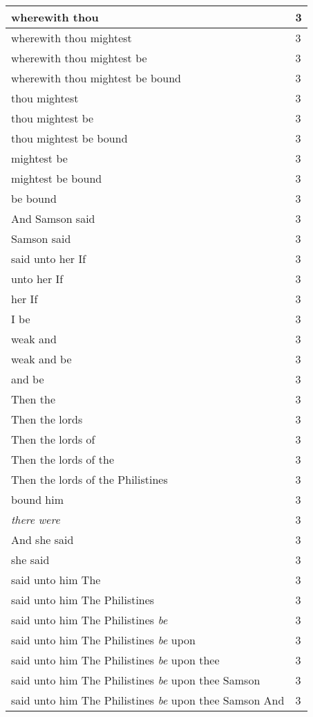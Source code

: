 \begin{center}
\begin{longtable}{|p{3.0in}|p{0.5in}|}
wherewith thou & 3\\ \hline 
wherewith thou mightest & 3\\ \hline 
wherewith thou mightest be & 3\\ \hline 
wherewith thou mightest be bound & 3\\ \hline 
thou mightest & 3\\ \hline 
thou mightest be & 3\\ \hline 
thou mightest be bound & 3\\ \hline 
mightest be & 3\\ \hline 
mightest be bound & 3\\ \hline 
be bound & 3\\ \hline 
And Samson said & 3\\ \hline 
Samson said & 3\\ \hline 
said unto her If & 3\\ \hline 
unto her If & 3\\ \hline 
her If & 3\\ \hline 
I be & 3\\ \hline 
weak and & 3\\ \hline 
weak and be & 3\\ \hline 
and be & 3\\ \hline 
Then the & 3\\ \hline 
Then the lords & 3\\ \hline 
Then the lords of & 3\\ \hline 
Then the lords of the & 3\\ \hline 
Then the lords of the Philistines & 3\\ \hline 
bound him & 3\\ \hline 
\emph{there} \emph{were} & 3\\ \hline 
And she said & 3\\ \hline 
she said & 3\\ \hline 
said unto him The & 3\\ \hline 
said unto him The Philistines & 3\\ \hline 
said unto him The Philistines \emph{be} & 3\\ \hline 
said unto him The Philistines \emph{be} upon & 3\\ \hline 
said unto him The Philistines \emph{be} upon thee & 3\\ \hline 
said unto him The Philistines \emph{be} upon thee Samson & 3\\ \hline 
said unto him The Philistines \emph{be} upon thee Samson And & 3\\ \hline 

\end{longtable}
\end{center}
